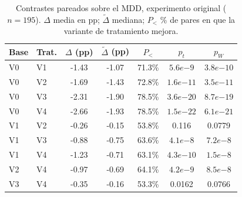 \begin{table}[ht]
  \centering
  \caption{Contrastes pareados sobre el MDD, experimento original ($n=195$). $\Delta$ media en pp; $\tilde{\Delta}$ mediana; $P_{<}$ \% de pares en que la variante de tratamiento mejora.}
  \label{tab:contrasts_original}
  \begin{tabular}{llccccc}
    \toprule
    Base & Trat. & $\Delta$ (pp) & $\tilde{\Delta}$ (pp) & $P_{<}$ & $p_t$ & $p_W$ \\
    \midrule
    V0 & V1 & -1.43 & -1.07 & 71.3\% & $5.6e{-9}$ & $3.8e{-10}$ \\
    V0 & V2 & -1.69 & -1.43 & 72.8\% & $1.6e{-11}$ & $3.5e{-11}$ \\
    V0 & V3 & -2.31 & -1.90 & 78.5\% & $3.6e{-20}$ & $8.7e{-19}$ \\
    V0 & V4 & -2.66 & -1.93 & 78.5\% & $1.5e{-22}$ & $6.1e{-21}$ \\
    V1 & V2 & -0.26 & -0.15 & 53.8\% & 0.116 & 0.0779 \\
    V1 & V3 & -0.88 & -0.75 & 63.6\% & $4.1e{-8}$ & $7.2e{-8}$ \\
    V1 & V4 & -1.23 & -0.71 & 63.1\% & $4.3e{-10}$ & $1.5e{-8}$ \\
    V2 & V4 & -0.97 & -0.69 & 64.1\% & $4.2e{-9}$ & $8.5e{-8}$ \\
    V3 & V4 & -0.35 & -0.16 & 53.3\% & 0.0162 & 0.0766 \\
    \bottomrule
  \end{tabular}
\end{table}
